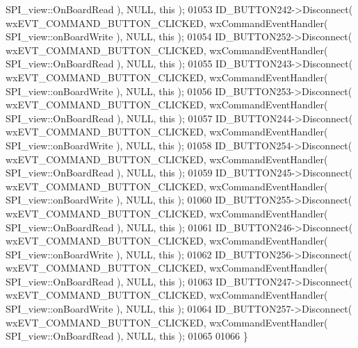 \begin{DoxyCode}
      SPI_view::OnBoardRead ), NULL, \textcolor{keyword}{this} );
01053     ID_BUTTON242->Disconnect( wxEVT\_COMMAND\_BUTTON\_CLICKED, wxCommandEventHandler( 
      SPI_view::onBoardWrite ), NULL, \textcolor{keyword}{this} );
01054     ID_BUTTON252->Disconnect( wxEVT\_COMMAND\_BUTTON\_CLICKED, wxCommandEventHandler( 
      SPI_view::OnBoardRead ), NULL, \textcolor{keyword}{this} );
01055     ID_BUTTON243->Disconnect( wxEVT\_COMMAND\_BUTTON\_CLICKED, wxCommandEventHandler( 
      SPI_view::onBoardWrite ), NULL, \textcolor{keyword}{this} );
01056     ID_BUTTON253->Disconnect( wxEVT\_COMMAND\_BUTTON\_CLICKED, wxCommandEventHandler( 
      SPI_view::OnBoardRead ), NULL, \textcolor{keyword}{this} );
01057     ID_BUTTON244->Disconnect( wxEVT\_COMMAND\_BUTTON\_CLICKED, wxCommandEventHandler( 
      SPI_view::onBoardWrite ), NULL, \textcolor{keyword}{this} );
01058     ID_BUTTON254->Disconnect( wxEVT\_COMMAND\_BUTTON\_CLICKED, wxCommandEventHandler( 
      SPI_view::OnBoardRead ), NULL, \textcolor{keyword}{this} );
01059     ID_BUTTON245->Disconnect( wxEVT\_COMMAND\_BUTTON\_CLICKED, wxCommandEventHandler( 
      SPI_view::onBoardWrite ), NULL, \textcolor{keyword}{this} );
01060     ID_BUTTON255->Disconnect( wxEVT\_COMMAND\_BUTTON\_CLICKED, wxCommandEventHandler( 
      SPI_view::OnBoardRead ), NULL, \textcolor{keyword}{this} );
01061     ID_BUTTON246->Disconnect( wxEVT\_COMMAND\_BUTTON\_CLICKED, wxCommandEventHandler( 
      SPI_view::onBoardWrite ), NULL, \textcolor{keyword}{this} );
01062     ID_BUTTON256->Disconnect( wxEVT\_COMMAND\_BUTTON\_CLICKED, wxCommandEventHandler( 
      SPI_view::OnBoardRead ), NULL, \textcolor{keyword}{this} );
01063     ID_BUTTON247->Disconnect( wxEVT\_COMMAND\_BUTTON\_CLICKED, wxCommandEventHandler( 
      SPI_view::onBoardWrite ), NULL, \textcolor{keyword}{this} );
01064     ID_BUTTON257->Disconnect( wxEVT\_COMMAND\_BUTTON\_CLICKED, wxCommandEventHandler( 
      SPI_view::OnBoardRead ), NULL, \textcolor{keyword}{this} );
01065     
01066 \}
\end{DoxyCode}
